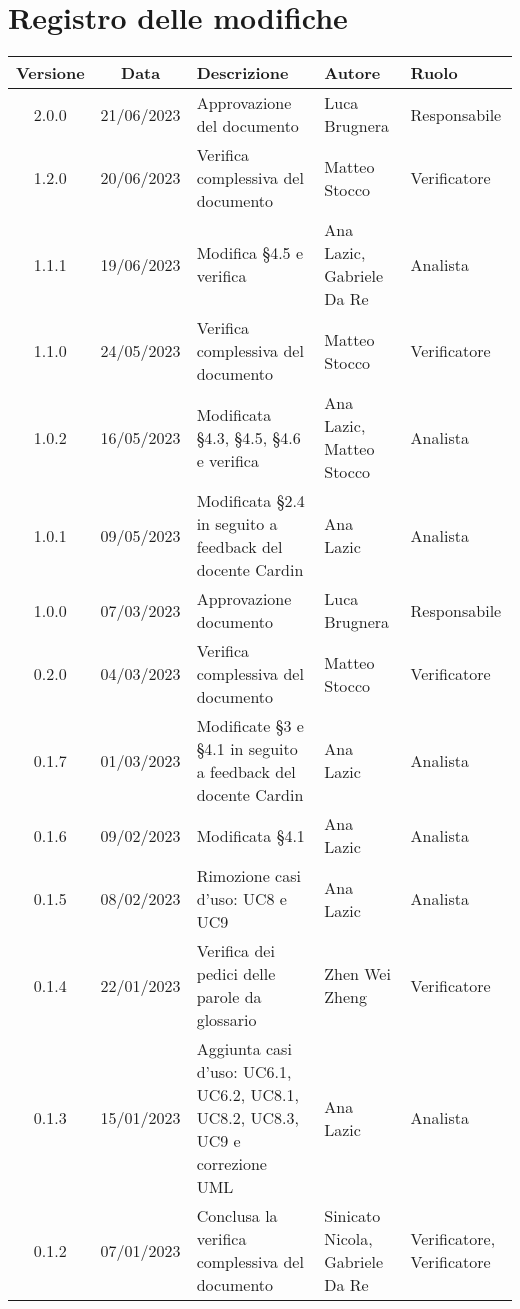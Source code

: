 \section*{Registro delle modifiche}
\begin{center}
\setlength\extrarowheight{5pt}
\renewcommand\tabularxcolumn[1]{>{\Centering}m{#1}}
\begin{tabularx}{\textwidth}{| c | c | X | X | X |} 
	\hline
	\rowcolor{white}
	\textbf{Versione} & \textbf{Data} & \textbf{Descrizione} & \textbf{Autore} & \textbf{Ruolo}\\
	\hline
	2.0.0 & 21/06/2023 & Approvazione del documento & Luca Brugnera & Responsabile\\
	\hline
	1.2.0 & 20/06/2023 & Verifica complessiva del documento & Matteo Stocco & Verificatore\\
	\hline
	1.1.1 & 19/06/2023 & Modifica §4.5 e verifica & Ana Lazic, Gabriele Da Re & Analista\\
 	\hline
	1.1.0 & 24/05/2023 & Verifica complessiva del documento & Matteo Stocco & Verificatore \\
 	\hline
	1.0.2 & 16/05/2023 & Modificata §4.3, §4.5, §4.6 e verifica & Ana Lazic, Matteo Stocco & Analista\\
    \hline
	1.0.1 & 09/05/2023 & Modificata §2.4 in seguito a feedback del docente Cardin  & Ana Lazic & Analista\\
	\hline
	1.0.0 & 07/03/2023 & Approvazione documento & Luca Brugnera & Responsabile\\
	\hline
	0.2.0 & 04/03/2023 & Verifica complessiva del documento & Matteo Stocco & Verificatore \\
 	\hline
	0.1.7 & 01/03/2023 & Modificate §3 e §4.1 in seguito a feedback del docente Cardin & Ana Lazic & Analista \\
	\hline
	0.1.6 & 09/02/2023 & Modificata §4.1 & Ana Lazic & Analista \\
 	\hline
	0.1.5 & 08/02/2023 & Rimozione casi d'uso: UC8 e UC9 & Ana Lazic & Analista \\
	\hline
	0.1.4 & 22/01/2023 & Verifica dei pedici delle parole da glossario & Zhen Wei Zheng & Verificatore \\
    	\hline
   	 0.1.3 & 15/01/2023 & Aggiunta casi d'uso: UC6.1, UC6.2, UC8.1, UC8.2, UC8.3, UC9 e correzione UML & Ana Lazic & Analista \\
	\hline
	0.1.2 & 07/01/2023 & Conclusa la verifica complessiva del documento & Sinicato Nicola, Gabriele Da Re & Verificatore, Verificatore \\

\end{tabularx}
\end{center}
